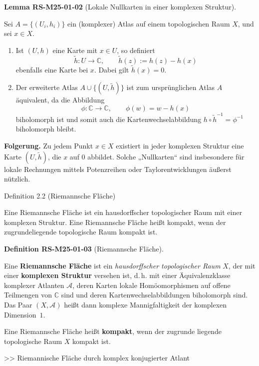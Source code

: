 \documentclass[10pt, letterpaper]{article}
\newcommand{\CustomHeading}[3]{%
  \par\medskip\noindent%
  \textbf{#1 #2} \textnormal{(#3)}.\enskip%
}
\newenvironment{DEF}[2]{\begin{unitbox}\CustomHeading{Definition}{#1}{#2}}{\end{unitbox}}
\newenvironment{LEM}[2]{\begin{unitbox}\CustomHeading{Lemma}{#1}{#2}}{\end{unitbox}}
\begin{document}
\begin{LEM}{RS-M25-01-02}{Lokale Nullkarten in einer komplexen Struktur}
Sei $A=\{(U_i,h_i)\}$ ein (komplexer) Atlas auf einem topologischen Raum $X$, und sei $x\in X$. 
\begin{enumerate}
\item Ist $(U,h)$ eine Karte mit $x\in U$, so definiert
\[
\widetilde{h}:U\longrightarrow\mathbb{C},\qquad \widetilde{h}(z):=h(z)-h(x)
\]
ebenfalls eine Karte bei $x$. Dabei gilt $\widetilde{h}(x)=0$.
\item Der erweiterte Atlas $A\cup\{(U,\widetilde{h})\}$ ist zum ursprünglichen Atlas $A$ äquivalent, da die Abbildung
\[
\phi:\mathbb{C}\longrightarrow\mathbb{C},\qquad \phi(w)=w-h(x)
\]
biholomorph ist und somit auch die Kartenwechselabbildung $h\circ \widetilde{h}^{-1}=\phi^{-1}$ biholomorph bleibt.
\end{enumerate}
\textbf{Folgerung.}  
Zu jedem Punkt $x\in X$ existiert in jeder komplexen Struktur eine Karte $(U,\widetilde{h})$, die $x$ auf $0$ abbildet.  
Solche „Nullkarten“ sind insbesondere für lokale Rechnungen mittels Potenzreihen oder Taylorentwicklungen äußerst nützlich.
\end{LEM}



Definition 2.2 (Riemannsche Fläche) 

Eine Riemannsche Fläche ist ein hausdorffscher topologischer Raum mit einer komplexen Struktur. Eine Riemannsche Fläche heißt kompakt, wenn der zugrundeliegende topologische Raum kompakt ist.


\begin{DEF}{RS-M25-01-03}{Riemannsche Fläche}
Eine \textbf{Riemannsche Fläche} ist ein \textit{hausdorffscher topologischer Raum} $X$, der mit einer \textbf{komplexen Struktur} versehen ist, d.\,h. mit einer Äquivalenzklasse komplexer Atlanten $\mathcal{A}$, deren Karten lokale Homöomorphismen auf offene Teilmengen von $\mathbb{C}$ sind und deren Kartenwechselabbildungen biholomorph sind.  
Das Paar $(X,\mathcal{A})$ heißt dann komplexe Mannigfaltigkeit der komplexen Dimension~$1$.  

Eine Riemannsche Fläche heißt \textbf{kompakt}, wenn der zugrunde liegende topologische Raum $X$ kompakt ist.
\end{DEF}



>> Riemannische Fläche durch komplex konjugierter Atlant
\end{document}
